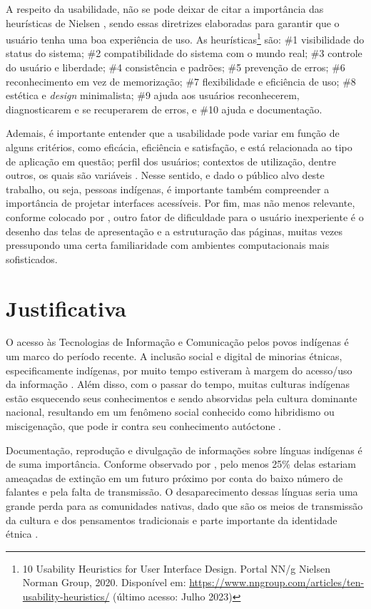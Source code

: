 A respeito da usabilidade, não se pode deixar de citar a importância das heurísticas de Nielsen \cite{nielsen1994}, sendo essas diretrizes elaboradas para garantir que o
usuário tenha uma boa experiência de uso. As heurísticas\footnote{10 Usability Heuristics for User Interface Design. Portal NN/g Nielsen Norman Group, 2020. Disponível
em: \url{https://www.nngroup.com/articles/ten-usability-heuristics/} (último acesso: Julho 2023)} são: \#1 visibilidade do status do sistema; \#2 compatibilidade do
sistema com o mundo real; \#3 controle do usuário e liberdade; \#4 consistência e padrões; \#5 prevenção de erros; \#6 reconhecimento em vez de memorização; \#7
flexibilidade e eficiência de uso; \#8 estética e \textit{design} minimalista; \#9 ajuda aos usuários reconhecerem, diagnosticarem e se recuperarem de erros, e \#10 ajuda e 
documentação.

Ademais, é importante entender que a usabilidade pode variar em função de alguns critérios, como eficácia, eficiência e satisfação, e está relacionada ao tipo de
aplicação em questão; perfil dos usuários; contextos de utilização, dentre outros, os quais são variáveis \cite{winckler2022}. Nesse sentido, e dado o público alvo deste
trabalho, ou seja, pessoas indígenas, é importante também compreender a importância de projetar interfaces acessíveis. Por fim, mas não menos relevante, conforme colocado 
por , outro fator de dificuldade para o usuário inexperiente é o desenho das telas de apresentação e a estruturação das páginas, muitas vezes 
pressupondo uma certa familiaridade com ambientes computacionais mais sofisticados.

\section{Justificativa}
\label{sec:Justificativa}

O acesso às Tecnologias de Informação e Comunicação pelos povos indígenas é um marco do período recente. A inclusão social e digital de minorias étnicas, especificamente
indígenas, por muito tempo estiveram à margem do acesso/uso da informação \cite{pinto2010}. Além disso, com o passar do tempo, muitas culturas indígenas estão esquecendo
seus conhecimentos e sendo absorvidas pela cultura dominante nacional, resultando em um fenômeno social conhecido como hibridismo ou miscigenação, que pode ir contra seu
conhecimento autóctone \cite{pinto2010}.

Documentação, reprodução e divulgação de informações sobre línguas indígenas é de suma importância. Conforme observado por ,
pelo menos 25\% delas estariam ameaçadas de extinção em um futuro próximo por conta do baixo número de falantes e pela falta de transmissão. O desaparecimento dessas línguas
seria uma grande perda para as comunidades nativas, dado que são os meios de transmissão da cultura e dos pensamentos tradicionais e parte importante da identidade étnica
\cite{moore2008}.

